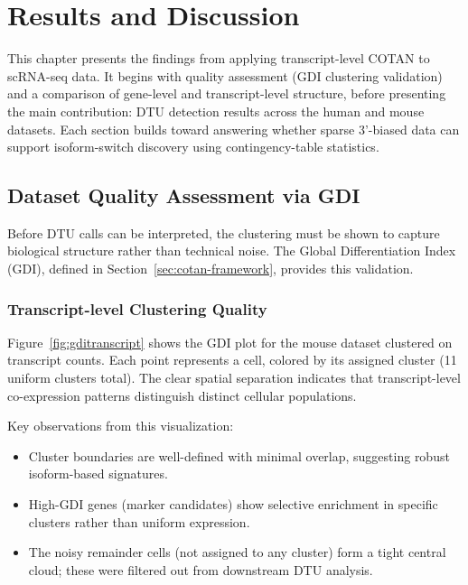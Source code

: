 \chapter{Results and Discussion}\label{chap:results}

This chapter presents the findings from applying transcript-level COTAN to scRNA-seq data. It begins with quality assessment (GDI clustering validation) and a comparison of gene-level and transcript-level structure, before presenting the main contribution: DTU detection results across the human and mouse datasets. Each section builds toward answering whether sparse 3'-biased data can support isoform-switch discovery using contingency-table statistics.

\section{Dataset Quality Assessment via GDI}

Before DTU calls can be interpreted, the clustering must be shown to capture biological structure rather than technical noise. The Global Differentiation Index (GDI), defined in Section~\ref{sec:cotan-framework}, provides this validation.

\subsection*{Transcript-level Clustering Quality}\label{sec:gdi-transcript}

Figure~\ref{fig:gditranscript} shows the GDI plot for the mouse dataset clustered on transcript counts. Each point represents a cell, colored by its assigned cluster (11 uniform clusters total). The clear spatial separation indicates that transcript-level co-expression patterns distinguish distinct cellular populations.

Key observations from this visualization:
\begin{itemize}
    \item Cluster boundaries are well-defined with minimal overlap, suggesting robust isoform-based signatures.
    \item High-GDI genes (marker candidates) show selective enrichment in specific clusters rather than uniform expression.
    \item The noisy remainder cells (not assigned to any cluster) form a tight central cloud; these were filtered out from downstream DTU analysis.
\end{itemize}


